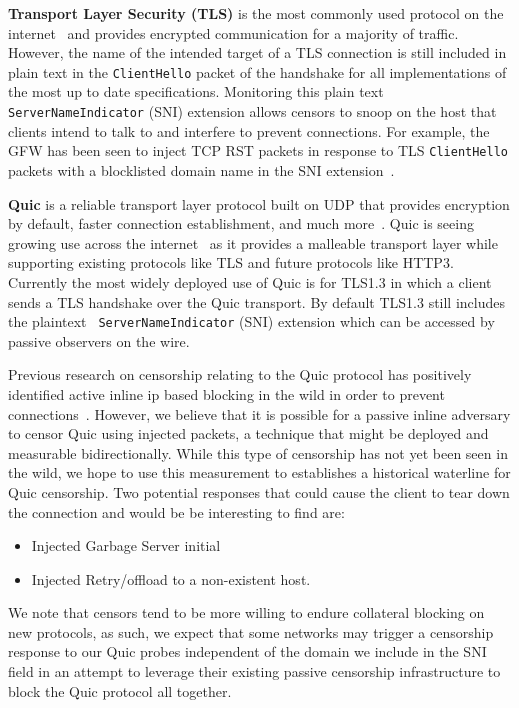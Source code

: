{\bf Transport Layer Security (TLS)} is the most commonly used
protocol on the internet~\cite{} and provides encrypted communication for a
majority of traffic. However, the name of the intended target of a TLS
connection is still included in plain text in the {\tt ClientHello} packet of
the handshake for all implementations of the most up to date specifications.
Monitoring this plain text {\tt ServerNameIndicator} (SNI) extension allows
censors to snoop on the host that clients intend to talk to and interfere to
prevent connections. For example, the GFW has been seen to inject TCP RST
packets in response to TLS {\tt ClientHello} packets with a blocklisted domain
name in the SNI extension~\cite{}.

{\bf Quic} is a reliable transport layer protocol built on UDP that provides
encryption by default, faster connection establishment, and much
more~\cite{RFC9000}. Quic is seeing growing use across the internet~\cite{} as
it provides a malleable transport layer while supporting existing protocols like
TLS and future protocols like HTTP3. Currently the most widely deployed use of
Quic is for TLS1.3 in which a client sends a TLS handshake over the Quic
transport. By default TLS1.3 still includes the plaintext {\tt
ServerNameIndicator} (SNI) extension which can be accessed by passive observers
on the wire.

Previous research on censorship relating to the Quic protocol has positively
identified active inline ip based blocking in the wild in order to prevent
connections~\cite{}. However, we believe that it is possible for a passive
inline adversary to censor Quic using injected packets, a technique that might be
deployed and measurable bidirectionally. While this type of censorship has not
yet been seen in the wild, we hope to use this measurement to establishes a
historical waterline for Quic censorship. Two potential responses that could
cause the client to tear down the connection and would be be interesting to find
are:
\begin{itemize}
	\item Injected Garbage Server initial
	\item Injected Retry/offload to a non-existent host.
\end{itemize}

We note that censors tend to be more willing to endure collateral blocking on
new protocols, as such, we expect that some networks may trigger a censorship
response to our Quic probes independent of the domain we include in the SNI
field in an attempt to leverage their existing passive censorship infrastructure
to block the Quic protocol all together.


